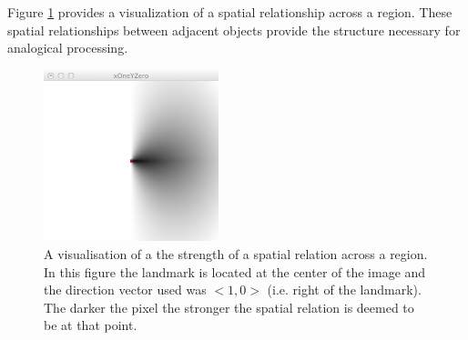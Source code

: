 Figure \ref{fig:spr} provides a visualization of a spatial relationship across a region. These spatial relationships between adjacent objects provide the structure necessary for analogical processing.

\begin{figure}
\centerline{
\includegraphics[width=2in]{./images/spatialRelations/xOneYZeroWhite.png}
}
\caption{A visualisation of a the strength of a spatial relation across a region. In this figure the landmark is located at the center of the image and the direction vector used was $<1,0>$ (i.e. right of the landmark). The darker the pixel the stronger the spatial relation is deemed to be at that point.}
\label{fig:spr}
\end{figure}

